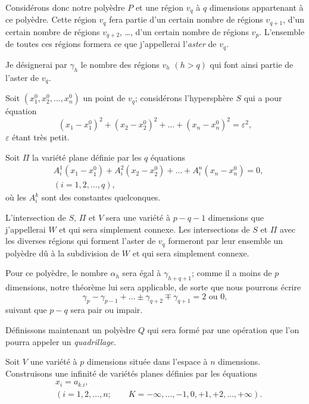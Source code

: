 \documentclass{article}
\begin{document}
Considérons donc notre polyèdre $P$ et une région $v_{q}$ à $q$ dimensions appartenant à ce polyèdre. Cette région $v_{q}$ fera partie d'un certain nombre de régions $v_{q+1}$, d'un certain nombre de régions $v_{q+2}$, \ldots, d'un certain nombre de régions $v_{p}$. L'ensemble de toutes ces régions formera ce que j'appellerai l'\emph{aster} de $v_{q}$.

Je désignerai par $\gamma_{h}$ le nombre des régions $v_{h}$ $(h > q)$ qui font ainsi partie de l'aster de $v_{q}$.

Soit $(x^{0}_{1}, x^{0}_{2}, \ldots, x^{0}_{n})$ un point de $v_{q}$; considérons l'hypersphère $S$ qui a pour équation
\[ (x_{1} - x^{0}_{1})^{2} + (x_{2} - x^{0}_{2})^{2} + \ldots + (x_{n} - x^{0}_{n})^{2} = \varepsilon^{2}, \]
$\varepsilon$ étant très petit.

Soit $\Pi$ la variété plane définie par les $q$ équations
\[ \begin{aligned} &A^{1}_{i}(x_{1} - x^{0}_{1}) + A^{2}_{i}(x_{2} - x^{0}_{2}) + \ldots + A^{n}_{i}(x_{n} - x^{0}_{n}) = 0,\\ &(i = 1, 2, \ldots, q), \end{aligned} \]
où les $A^{k}_{i}$ sont des constantes quelconques.

L'intersection de $S$, $\Pi$ et $V$ sera une variété à $p - q - 1$ dimensions que j'appellerai $W$ et qui sera simplement connexe. Les intersections de $S$ et $\Pi$ avec les diverses régions qui forment l'aster de $v_{q}$ formeront par leur ensemble un polyèdre dû à la subdivision de $W$ et qui sera simplement connexe.

Pour ce polyèdre, le nombre $\alpha_{h}$ sera égal à $\gamma_{h+q+1}$; comme il a moins de $p$ dimensions, notre théorème lui sera applicable, de sorte que nous pourrons écrire
\[ \gamma_{p} - \gamma_{p-1} + \ldots \pm \gamma_{q+2} \mp \gamma_{q+1} = 2 \text{ ou } 0, \tag{A} \]
suivant que $p - q$ sera pair ou impair.

Définissons maintenant un polyèdre $Q$ qui sera formé par une opération que l'on pourra appeler un \emph{quadrillage}.

Soit $V$ une variété à $p$ dimensions située dans l'espace à $n$ dimensions. Construisons une infinité de variétés planes définies par les équations
\[ \begin{aligned} &x_{i} = a_{k.i},\\ &(i = 1, 2, \ldots, n; \qquad K = -\infty, \ldots, -1, 0, +1, +2, \ldots, +\infty). \end{aligned} \tag{B} \]
\end{document}
